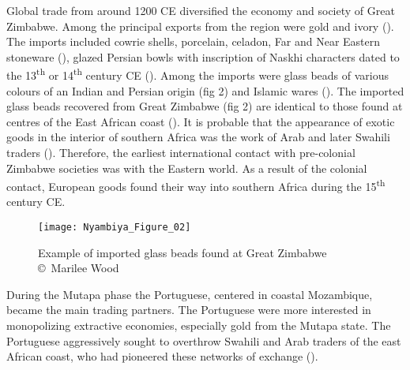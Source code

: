 Global trade from around 1200 CE diversified the economy and society of Great Zimbabwe.  Among the principal exports from the region were gold and ivory (\cites[][]{mudenge1988}[][]{pwiti2005}[][]{pikirayi2006}). The imports included cowrie shells, porcelain, celadon, Far and Near Eastern stoneware (\cites[][]{garlake1973}[][]{garlake1982}[][]{pikirayi2006}), glazed Persian bowls with inscription of Naskhi characters dated to the 13\textsuperscript{th} or 14\textsuperscript{th} century CE (\cites[][]{garlake1973}). Among the imports were glass beads of various colours of an Indian and Persian origin (fig 2) and Islamic wares (\cites[][]{huffman1972}[][]{huffman2000}[][]{kim2008}[][]{chirikure2008}). The imported glass beads recovered from Great Zimbabwe (fig 2) are identical to those found at centres of the East African coast (\cites[][]{chirikure2008}[][]{kusimba2017}). It is probable that the appearance of exotic goods in the interior of southern Africa was the work of Arab and later Swahili traders (\cites[][]{kusimba1999}[][22]{ndoro2001}). Therefore, the earliest international contact with pre-colonial Zimbabwe societies was with the Eastern world. As a result of the colonial contact, European goods found their way into southern Africa during the 15\textsuperscript{th} century CE.

\begin{figure}[!htb]
	\texttt{[image: Nyambiya\_Figure\_02]}
	\caption{Example of imported glass beads found at Great Zimbabwe
		{\normalfont\scriptsize \\ \copyright\ Marilee Wood
	}}
	\label{fig:Nyambiya_Figure_02}
\end{figure}

During the  Mutapa phase the Portuguese, centered in coastal Mozambique, became the main trading partners. The Portuguese were more interested in monopolizing extractive economies, especially gold from the Mutapa state. The Portuguese aggressively sought to overthrow Swahili and Arab traders of the east African coast, who had pioneered these networks of exchange (\cites[][]{sinclair1987}[][]{kusimba1999}[][]{pwiti2005}).

